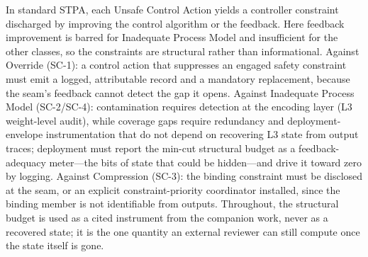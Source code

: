In standard STPA, each Unsafe Control Action yields a controller constraint discharged by improving the control algorithm or the feedback. Here feedback improvement is barred for Inadequate Process Model and insufficient for the other classes, so the constraints are structural rather than informational. Against Override (SC-1): a control action that suppresses an engaged safety constraint must emit a logged, attributable record and a mandatory replacement, because the seam's feedback cannot detect the gap it opens. Against Inadequate Process Model (SC-2/SC-4): contamination requires detection at the encoding layer (L3 weight-level audit), while coverage gaps require redundancy and deployment-envelope instrumentation that do not depend on recovering L3 state from output traces; deployment must report the min-cut structural budget as a feedback-adequacy meter---the bits of state that could be hidden---and drive it toward zero by logging. Against Compression (SC-3): the binding constraint must be disclosed at the seam, or an explicit constraint-priority coordinator installed, since the binding member is not identifiable from outputs. Throughout, the structural budget is used as a cited instrument from the companion work, never as a recovered state; it is the one quantity an external reviewer can still compute once the state itself is gone.

